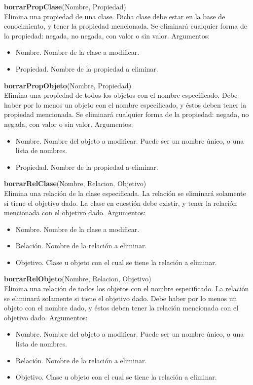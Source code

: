 \documentclass[11pt]{article}
\newcommand{\comando}[2]{
    \textbf{#1}(#2)\\
}
\newenvironment{args}{
    \newline
    Argumentos:
    \begin{itemize}
}{
    \end{itemize}
    \bigskip
}
\begin{document}
\comando{borrarPropClase}{Nombre, Propiedad}
Elimina una propiedad de una clase. Dicha clase debe estar en la base de conocimiento, y tener la propiedad mencionada. Se eliminará cualquier forma de la propiedad: negada, no negada, con valor o sin valor.
\begin{args}
    \item Nombre. Nombre de la clase a modificar.
    \item Propiedad. Nombre de la propiedad a eliminar.
\end{args}

\comando{borrarPropObjeto}{Nombre, Propiedad}
Elimina una propiedad de todos los objetos con el nombre especificado. Debe haber por lo menos un objeto con el nombre especificado, y éstos deben tener la propiedad mencionada. Se eliminará cualquier forma de la propiedad: negada, no negada, con valor o sin valor.
\begin{args}
    \item Nombre. Nombre del objeto a modificar. Puede ser un nombre único, o una lista de nombres.
    \item Propiedad. Nombre de la propiedad a eliminar.
\end{args}

\comando{borrarRelClase}{Nombre, Relacion, Objetivo}
Elimina una relación de la clase especificada. La relación se eliminará solamente si tiene el objetivo dado. La clase en cuestión debe existir, y tener la relación mencionada con el objetivo dado.
\begin{args}
    \item Nombre. Nombre de la clase a modificar.
    \item Relación. Nombre de la relación a eliminar.
    \item Objetivo. Clase u objeto con el cual se tiene la relación a eliminar.
\end{args}

\comando{borrarRelObjeto}{Nombre, Relacion, Objetivo}
Elimina una relación de todos los objetos con el nombre especificado. La relación se eliminará solamente si tiene el objetivo dado. Debe haber por lo menos un objeto con el nombre dado, y éstos deben tener la relación mencionada con el objetivo dado.
\begin{args}
    \item Nombre. Nombre del objeto a modificar. Puede ser un nombre único, o una lista de nombres.
    \item Relación. Nombre de la relación a eliminar.
    \item Objetivo. Clase u objeto con el cual se tiene la relación a eliminar.
\end{args}
\end{document}
